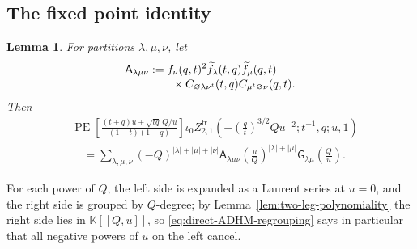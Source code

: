 \documentclass{amsart}
\newtheorem{lemma}{Lemma}
\theoremstyle{definition}
\numberwithin{equation}{section}
\newcommand{\PE}{\operatorname{PE}}
\newcommand{\K}{\mathbb K}
\begin{document}
\subsection{The fixed point identity}
\begin{lemma}
\label{lem:direct-ADHM-regrouping}
For partitions \(\lambda,\mu,\nu\), let
\begin{align*}
 \mathsf A_{\lambda\mu\nu}
 &:={}
 f_\nu(q,t)^2\widetilde f_\lambda(t,q)
 \widetilde f_\mu(q,t)\notag\\[-2pt]
 &\qquad\times
 C_{\varnothing\lambda\nu^t}(t,q)
 C_{\mu^t\varnothing\nu}(q,t).
\end{align*}
Then
\begin{equation}
\begin{aligned}
 &\PE\left[
 \frac{(t+q)u+\sqrt{tq}\,Q/u}{(1-t)(1-q)}
 \right]
 \iota_0 Z_{2,1}^{\mathrm{fr}}
 \left(-\left(\frac qt\right)^{3/2}Qu^{-2};t^{-1},q;u,1\right)\\
 &\quad=
 \sum_{\lambda,\mu,\nu}
 (-Q)^{|\lambda|+|\mu|+|\nu|}
 \mathsf A_{\lambda\mu\nu}
 \left(\frac uQ\right)^{|\lambda|+|\mu|}
 \mathsf G_{\lambda\mu}\left(\frac Qu\right).
\end{aligned}
\label{eq:direct-ADHM-regrouping}
\end{equation}
\end{lemma}

For each power of \(Q\), the left side is expanded as a Laurent series at \(u=0\), and the right side is grouped by \(Q\)-degree; by Lemma~\ref{lem:two-leg-polynomiality} the right side lies in \(\K[[Q,u]]\), so \eqref{eq:direct-ADHM-regrouping} says in particular that all negative powers of \(u\) on the left cancel.
\end{document}
